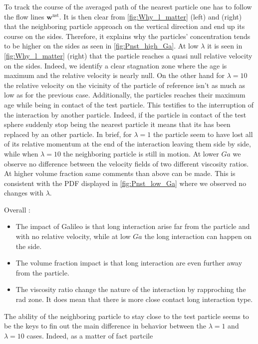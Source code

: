 To track the course of the averaged path of the nearest particle one has to follow the flow lines $\textbf{w}^\text{nst}$. 
It is then clear from \ref{fig:Why_l_matter} (left) and (right) that the neighboring particle approach on the vertical direction and end up its course on the sides. 
Therefore, it explains why the particles' concentration tends to be higher on the sides as seen in \ref{fig:Pnst_high_Ga}. 
At low $\lambda$ it is seen in \ref{fig:Why_l_matter} (right) that the particle reaches a quasi null relative velocity on the sides. 
Indeed, we identify a clear stagnation zone where the age is maximum and the relative velocity is nearly null. 
On the other hand for $\lambda =10$ the relative velocity on the vicinity of the particle of reference isn't as much as low as for the previous case.
Additionally,  the particles reaches their maximum age while being in contact of the test particle.
This testifies to the interruption of the interaction by another particle. 
Indeed, if the particle in contact of the test sphere suddenly stop being the nearest particle it means that its has been replaced by an other particle. 
In brief, for $\lambda =1$ the particle seem to have lost all of its relative momentum at the end of the interaction leaving them side by side, while when $\lambda =10$ the neighboring particle is still in motion.  
At lower $Ga$ we observe no difference between the velocity fields of two different viscosity ratios. 
At higher volume fraction same comments than above can be made. 
This is consistent with the PDF displayed in \ref{fig:Pnst_low_Ga} where we observed no changes with $\lambda$. 

Overall :
\begin{itemize}
    \item The impact of Galileo is that long interaction arise far from the particle and with no relative velocity, while at low $Ga$ the long interaction can happen on the side.
    \item The volume fraction impact is that long interaction are even further away from the particle. 
    \item The viscosity ratio change the nature of the interaction by rapproching the rad zone. 
    It does mean that there is more close contact long interaction type.
\end{itemize}

The ability of the neighboring particle to stay close to the test particle seems to be the keys to fin out the main difference in behavior between the $\lambda=1$ and  $\lambda = 10$ cases. 
Indeed, as a matter of fact partcile 


